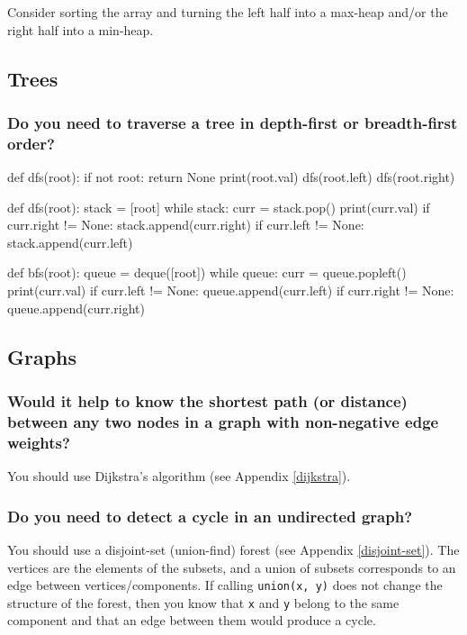 \documentclass[12pt, titlepage]{article}
\begin{document}
Consider sorting the array and turning the left half into a max-heap and/or the right half into a min-heap.

\subsection{Trees}

\subsubsection{Do you need to traverse a tree in depth-first or breadth-first order?}

\begin{python}
def dfs(root):
    if not root:
        return None
    print(root.val)
    dfs(root.left)
    dfs(root.right)
\end{python}

\begin{python}
def dfs(root):
    stack = [root]
    while stack:
    curr = stack.pop()
    print(curr.val)
    if curr.right != None:
        stack.append(curr.right)
    if curr.left != None:
        stack.append(curr.left)
\end{python}

\begin{python}
def bfs(root):
    queue = deque([root])
    while queue:
    curr = queue.popleft()
    print(curr.val)
    if curr.left != None:
        queue.append(curr.left)
    if curr.right != None:
        queue.append(curr.right)
\end{python}

\subsection{Graphs}

\subsubsection{Would it help to know the shortest path (or distance) between any two nodes in a graph with non-negative edge weights?}

You should use Dijkstra's algorithm (see Appendix \ref{dijkstra}).

\subsubsection{Do you need to detect a cycle in an undirected graph?}

You should use a disjoint-set (union-find) forest (see Appendix \ref{disjoint-set}). The vertices are the elements of the subsets, and a union of subsets corresponds to an edge between vertices/components. If calling \texttt{union(x, y)} does not change the structure of the forest, then you know that \texttt{x} and \texttt{y} belong to the same component and that an edge between them would produce a cycle.
\end{document}
